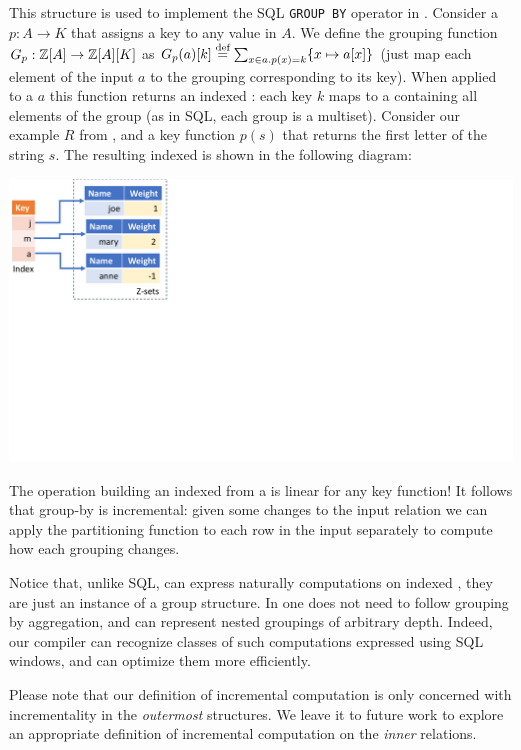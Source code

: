 This structure is used to implement the SQL \texttt{GROUP BY} operator
in \dbsp.  Consider a  $p: A \to K$
that assigns a key to any value in $A$.  We define the grouping
function $G_p: \mathbb{Z}[A] \to \mathbb{Z}[A][K]$ as $G_p(a)[k] \stackrel{\textrm{\scriptsize def}}{=} \sum_{x \in
  a.p(x)=k}\{ x \mapsto a[x] \}$ (just map each element of the input
$a$ to the \zr grouping corresponding to its key).  When applied to a
\zr $a$ this function returns an indexed \zr: each key $k$ maps to a
\zr containing all elements of the group (as in SQL, each group is a
multiset).  Consider our example \zr $R$ from ,
and a key function $p(s)$ that returns the first letter of the string
$s$.  The resulting indexed \zr is shown in the following diagram:

\begin{center}
  \includegraphics[trim={0 4.2in 7.5in 0},clip,scale=.34]{indexed.pdf}
\end{center}

The operation building an indexed \zr from a \zr is linear for any key
function!  It follows that group-by is incremental: given some changes
to the input relation we can apply the partitioning function to each
row in the input separately to compute how each grouping changes.

Notice that, unlike SQL, \dbsp can express naturally computations on
indexed \zrs, they are just an instance of a group structure.  In
\dbsp one does not need to follow grouping by aggregation, and \dbsp
can represent nested groupings of arbitrary depth.  Indeed, our
compiler can recognize classes of such computations expressed using
SQL windows, and can optimize them more efficiently.

Please note that our definition of incremental computation is only
concerned with incrementality in the \emph{outermost} structures.  We
leave it to future work to explore an appropriate definition of
incremental computation on the \emph{inner} relations.

